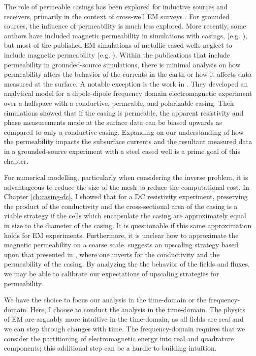 The role of permeable casings has been explored for inductive sources and receivers, primarily in the context of cross-well EM surveys \citep{Augustin1989, wuhabashy1994, Wilt1996, Becker1997, Lee1998, Lee2005, Kim2006}. For grounded sources, the influence of permeability is much less explored. More recently, some authors have included magnetic permeability in simulations with casings, (e.g. \citep{Kong2009}), but most of the published EM simulations of metallic cased wells neglect to include magnetic permeability (e.g. \citep{Swidinsky2013, Commer2015, Um2015, Fang2017, Puzyrev2017}). Within the publications that include permeability in grounded-source simulations, there is minimal analysis on how permeability alters the behavior of the currents in the earth or how it affects data measured at the surface. A notable exception is the work in \cite{Wait1985, Williams1985}. They developed an analytical model for a dipole-dipole frequency domain electromagnetic experiment over a halfspace with a conductive, permeable, and polarizable casing. Their simulations showed that if the casing is permeable, the apparent resistivity and phase measurements made at the surface data can be biased upwards as compared to only a conductive casing. Expanding on our understanding of how the permeability impacts the subsurface currents and the resultant measured data in a grounded-source experiment with a steel cased well is a prime goal of this chapter.

For numerical modelling, particularly when considering the inverse problem, it is advantageous to reduce the size of the mesh to reduce the computational cost. In Chapter \ref{ch:casing-dc}, I showed that for a DC resistivity experiment, preserving the product of the conductivity and the cross-sectional area of the casing is a viable strategy if the cells which encapsulate the casing are approximately equal in size to the diameter of the casing. It is questionable if this same approximation holds for EM experiments. Furthermore, it is unclear how to approximate the magnetic permeability on a coarse scale. \cite{Schwarzbach2018} suggests an upscaling strategy based upon that presented in \cite{Caudillo-Mata2017}, where one inverts for the conductivity and the permeability of the casing. By analyzing the the behavior of the fields and fluxes, we may be able to calibrate our expectations of upscaling strategies for permeability.

We have the choice to focus our analysis in the time-domain or the frequency-domain. Here, I choose to conduct the analysis in the time-domain. The physics of EM are arguably more intuitive in the time-domain, as all fields are real and we can step through changes with time. The frequency-domain requires that we consider the partitioning of electromagnetic energy into real and quadrature components; this additional step can be a hurdle to building intuition.

